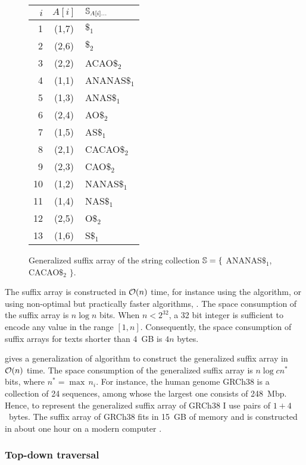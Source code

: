 \begin{figure}[h]
\begin{center}
\caption[Example of generalized suffix array]{Generalized suffix array of the string collection $\mathbb {S} = \{$ {\ttfamily ANANAS$\$_1$}, {\ttfamily CACAO$\$_2$} $\}$.}
\label{fig:gsa}
\ttfamily
\begin{tabular}{rcl}
$i$ & $A[i]$ & $\mathbb {S}_{A[i]\dots}$\\
\midrule
1 & (1,7) & $\$_1$\\
2 & (2,6) & $\$_2$\\
3 & (2,2) & ACAO$\$_2$\\
4 & (1,1) & ANANAS$\$_1$\\
5 & (1,3) & ANAS$\$_1$\\
6 & (2,4) & AO$\$_2$\\
7 & (1,5) & AS$\$_1$\\
8 & (2,1) & CACAO$\$_2$\\
9 & (2,3) & CAO$\$_2$\\
10 & (1,2) & NANAS$\$_1$\\
11 & (1,4) & NAS$\$_1$\\
12 & (2,5) & O$\$_2$\\
13 & (1,6) & S$\$_1$\\
\end{tabular}
\end{center}
\end{figure}

The suffix array is constructed in $\mathcal{O}(n)$ time, for instance using the \citep{Kaerkkaeinen2003} algorithm, or using non-optimal but practically faster algorithms, \eg \citep{Schuermann2007}.
The space consumption of the suffix array is $n \log{n}$ bits.
When $n < 2^{32}$, a 32 bit integer is sufficient to encode any value in the range $[1,n]$.
Consequently, the space consumption of suffix arrays for texts shorter than 4~GB is $4 n$ bytes.

\citeauthor{Weese2013} gives a generalization of \citeauthor{Kaerkkaeinen2003} algorithm to construct the generalized suffix array in $\mathcal{O}(n)$ time.
The space consumption of the generalized suffix array is $n \log{cn^*}$ bits, where $n^* = \max{\,n_i}$.
For instance, the human genome GRCh38 is a collection of 24 sequences, among whose the largest one consists of 248~Mbp.
Hence, to represent the generalized suffix array of GRCh38 I use pairs of $1+4$~bytes.
The suffix array of GRCh38 fits in 15~GB of memory and is constructed in about one hour on a modern computer \citep{Weese2013}.

\subsubsection{Top-down traversal}

